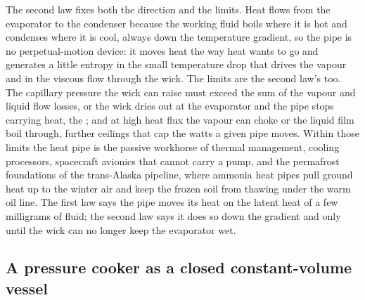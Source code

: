 The second law fixes both the direction and the limits. Heat flows from the
evaporator to the condenser because the working fluid boils where it is hot and
condenses where it is cool, always down the temperature gradient, so the pipe is
no perpetual-motion device: it moves heat the way heat wants to go and generates a
little entropy in the small temperature drop that drives the vapour and in the
viscous flow through the wick. The limits are the second law's too. The capillary
pressure the wick can raise must exceed the sum of the vapour and liquid flow
losses, or the wick dries out at the evaporator and the pipe stops carrying heat,
the ; and at high heat flux the vapour can choke or the
liquid film boil through, further ceilings that cap the watts a given pipe moves.
Within those limits the heat pipe is the passive workhorse of thermal management,
cooling processors, spacecraft avionics that cannot carry a pump, and the
permafrost foundations of the trans-Alaska pipeline, where ammonia heat pipes pull
ground heat up to the winter air and keep the frozen soil from thawing under the
warm oil line. The first law says the pipe moves its heat on the latent heat of a
few milligrams of fluid; the second law says it does so down the gradient and only
until the wick can no longer keep the evaporator wet.



\subsection{A pressure cooker as a closed constant-volume vessel}

